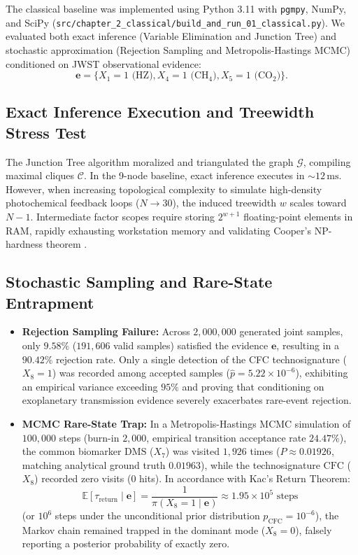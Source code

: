 The classical baseline was implemented using Python 3.11 with \texttt{pgmpy}, NumPy, and SciPy (\texttt{src/chapter\_2\_classical/build\_and\_run\_01\_classical.py}). We evaluated both exact inference (Variable Elimination and Junction Tree) and stochastic approximation (Rejection Sampling and Metropolis-Hastings MCMC) conditioned on JWST observational evidence:
\begin{equation}
\mathbf{e} = \{X_1 = 1 \text{ (HZ)}, X_4 = 1 \text{ ($\mathrm{CH}_4$)}, X_5 = 1 \text{ ($\mathrm{CO}_2$)}\}.
\label{eq:jwst_evidence_vector}
\end{equation}

\subsection{Exact Inference Execution and Treewidth Stress Test}
The Junction Tree algorithm moralized and triangulated the graph $\mathcal{G}$, compiling maximal cliques $\mathcal{C}$. In the 9-node baseline, exact inference executes in $\sim 12\,\mathrm{ms}$. However, when increasing topological complexity to simulate high-density photochemical feedback loops ($N \to 30$), the induced treewidth $w$ scales toward $N-1$. Intermediate factor scopes require storing $2^{w+1}$ floating-point elements in RAM, rapidly exhausting workstation memory and validating Cooper's NP-hardness theorem \cite{cooper1990}.

\subsection{Stochastic Sampling and Rare-State Entrapment}
\begin{itemize}
    \item \textbf{Rejection Sampling Failure:} Across $2,000,000$ generated joint samples, only $9.58\%$ ($191,606$ valid samples) satisfied the evidence $\mathbf{e}$, resulting in a $90.42\%$ rejection rate. Only a single detection of the CFC technosignature ($X_8=1$) was recorded among accepted samples ($\hat{p} = 5.22 \times 10^{-6}$), exhibiting an empirical variance exceeding $95\%$ and proving that conditioning on exoplanetary transmission evidence severely exacerbates rare-event rejection.
    \item \textbf{MCMC Rare-State Trap:} In a Metropolis-Hastings MCMC simulation of $100,000$ steps (burn-in $2,000$, empirical transition acceptance rate $24.47\%$), the common biomarker $\mathrm{DMS}$ ($X_7$) was visited $1,926$ times ($P \approx 0.01926$, matching analytical ground truth $0.01963$), while the technosignature $\mathrm{CFC}$ ($X_8$) recorded zero visits ($0$ hits). In accordance with Kac's Return Theorem:
    \begin{equation}
    \mathbb{E}[\tau_{\mathrm{return}} \mid \mathbf{e}] = \frac{1}{\pi(X_8 = 1 \mid \mathbf{e})} \approx 1.95 \times 10^5 \text{ steps}
    \end{equation}
    (or $10^6$ steps under the unconditional prior distribution $p_{\mathrm{CFC}} = 10^{-6}$), the Markov chain remained trapped in the dominant mode ($X_8 = 0$), falsely reporting a posterior probability of exactly zero.
\end{itemize}

